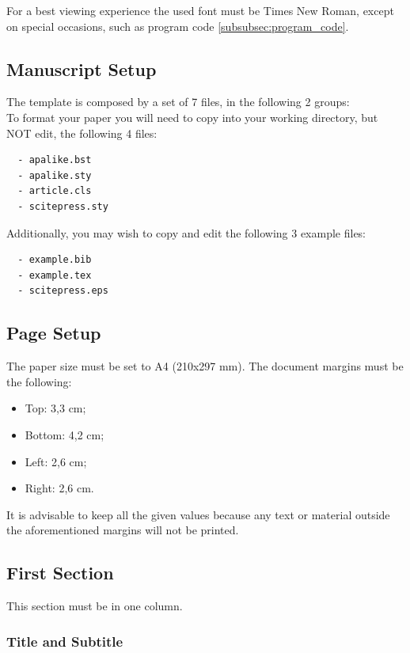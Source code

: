 \documentclass[a4paper,twoside]{article}
\begin{document}
For a best viewing experience the used font must be Times New
Roman, except on special occasions, such as program code
\ref{subsubsec:program_code}.


\subsection{Manuscript Setup}

\noindent The template is composed by a set of 7 files, in the
following 2 groups:\\
 To format your paper you will need to copy
into your working directory, but NOT edit, the following 4 files:
\begin{verbatim}
  - apalike.bst
  - apalike.sty
  - article.cls
  - scitepress.sty
\end{verbatim}

 Additionally, you may wish to copy and edit
the following 3 example files:
\begin{verbatim}
  - example.bib
  - example.tex
  - scitepress.eps
\end{verbatim}


\subsection{Page Setup}

The paper size must be set to A4 (210x297 mm). The document
margins must be the following:

\begin{itemize}
    \item Top: 3,3 cm;
    \item Bottom: 4,2 cm;
    \item Left: 2,6 cm;
    \item Right: 2,6 cm.
\end{itemize}

It is advisable to keep all the given values because any text or
material outside the aforementioned margins will not be printed.

\subsection{First Section}

This section must be in one column.

\vfill
\subsubsection{Title and Subtitle}
\end{document}
